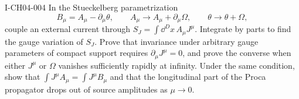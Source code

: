 \begin{exercise}{I-CH04-004}
In the Stueckelberg parametrization
\begin{equation*}
 B_\mu=A_\mu-\partial_\mu\theta,
 \qquad
 A_\mu\longrightarrow A_\mu+\partial_\mu\Omega,
 \qquad
 \theta\longrightarrow\theta+\Omega,
\end{equation*}
couple an external current through
$S_J=\int\dd^D x\,A_\mu J^\mu$.  Integrate by parts to find the gauge
variation of $S_J$.  Prove that invariance under arbitrary gauge parameters
of compact support requires $\partial_\mu J^\mu=0$, and prove the converse
when either $J^\mu$ or $\Omega$ vanishes sufficiently rapidly at infinity.
Under the same condition, show that
$\int J^\mu A_\mu=\int J^\mu B_\mu$ and that the longitudinal part of the
Proca propagator drops out of source amplitudes as $\mu\to0$.
\end{exercise}
